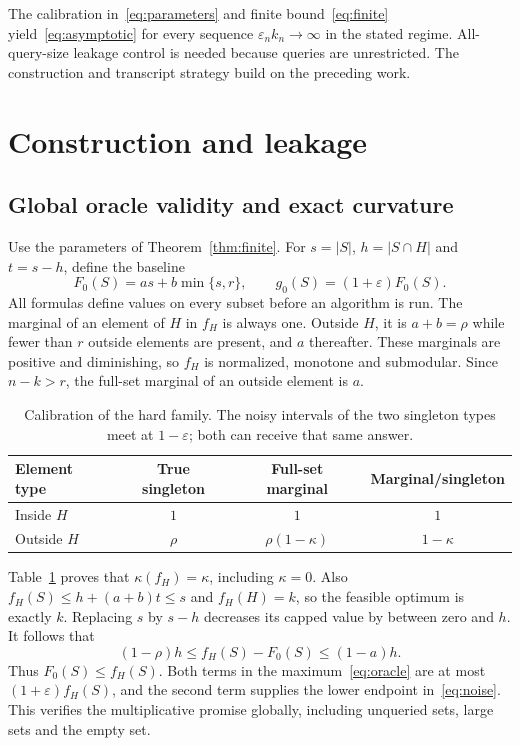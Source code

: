 \documentclass[manuscript,11pt,screen,nonacm]{acmart}
\newcommand{\eps}{\varepsilon}
\begin{document}
The calibration in~\eqref{eq:parameters} and finite bound~\eqref{eq:finite}
yield~\eqref{eq:asymptotic}
for every sequence $\eps_n k_n\to\infty$ in the stated regime.
All-query-size leakage control is needed because queries are unrestricted.
The construction and transcript strategy build on the preceding work.

\section{Construction and leakage}

\subsection{Global oracle validity and exact curvature}

Use the parameters of Theorem~\ref{thm:finite}. For $s=|S|$,
$h=|S\cap H|$ and $t=s-h$, define the baseline
\begin{equation}\label{eq:baseline}
 F_0(S)=a s+b\min\{s,r\},\qquad g_0(S)=(1+\eps)F_0(S).
\end{equation}
All formulas define values on every subset before an algorithm is run.
The marginal of an element of $H$ in $f_H$ is always one. Outside $H$,
it is $a+b=\rho$ while fewer than $r$ outside elements are present,
and $a$ thereafter. These marginals are positive and diminishing, so
$f_H$ is normalized, monotone and submodular. Since $n-k>r$, the
full-set marginal of an outside element is $a$.

\begin{table}[htbp]
\caption{Calibration of the hard family. The noisy intervals of the two
singleton types meet at $1-\eps$; both can receive that same answer.}
\label{tab:calibration}
\centering
\begin{tabular}{lccc}
\toprule
Element type & True singleton & Full-set marginal & Marginal/singleton\\
\midrule
Inside $H$ & $1$ & $1$ & $1$\\
Outside $H$ & $\rho$ & $\rho(1-\kappa)$ & $1-\kappa$\\
\bottomrule
\end{tabular}
\end{table}

Table~\ref{tab:calibration} proves that $\kappa(f_H)=\kappa$, including
$\kappa=0$. Also $f_H(S)\le h+(a+b)t\le s$ and $f_H(H)=k$,
so the feasible optimum is exactly $k$.
Replacing $s$ by $s-h$ decreases its capped value by between zero and $h$.
It follows that
\begin{equation}\label{eq:difference}
 (1-\rho)h\le f_H(S)-F_0(S)\le(1-a)h.
\end{equation}
Thus $F_0(S)\le f_H(S)$. Both terms in the maximum~\eqref{eq:oracle}
are at most $(1+\eps)f_H(S)$, and the second term supplies the lower
endpoint in~\eqref{eq:noise}. This verifies the multiplicative promise
globally, including unqueried sets, large sets and the empty set.
\end{document}
